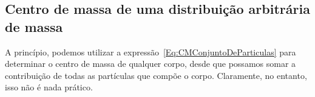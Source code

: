 \subsection{Centro de massa de uma distribuição arbitrária de massa}

A princípio, podemos utilizar a expressão~\eqref{Eq:CMConjuntoDeParticulas} para determinar o centro de massa de qualquer corpo, desde que possamos somar a contribuição de todas as partículas que compõe o corpo. Claramente, no entanto, isso não é nada prático. 


